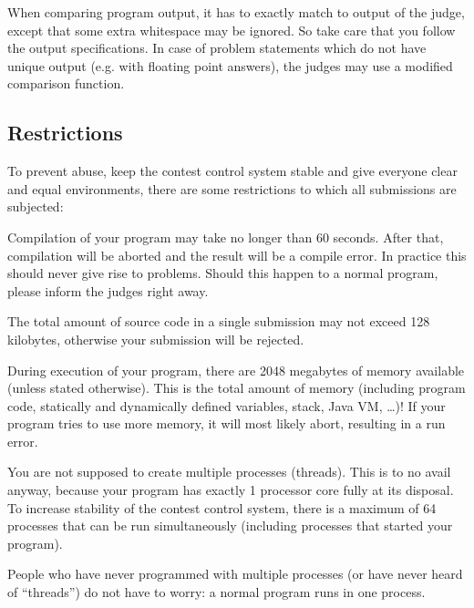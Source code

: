 When comparing program output, it has to exactly match to output of
the judge, except that some extra whitespace may be ignored. So take
care that you follow the output specifications. In case of problem
statements which do not have unique output (e.g. with floating point
answers), the judges may use a modified comparison function.

\subsection{Restrictions}\label{runlimits}

To prevent abuse, keep the contest control system stable and give everyone
clear and equal environments, there are some restrictions to which all
submissions are subjected:

\begin{description}
\item[compile time]
Compilation of your program may take no longer than 60
seconds. After that, compilation will be aborted and the result will
be a compile error. In practice this should never give rise to
problems. Should this happen to a normal program, please inform the
judges right away.

\item[source size]
The total amount of source code in a single submission may not exceed
128 kilobytes, otherwise your submission will be rejected.

\item[memory]
During execution of your program, there are 2048 megabytes of
memory available (unless stated otherwise). This is the total
amount of memory (including program code, statically and dynamically defined
variables, stack, Java VM, \dots)! If your program tries to use
more memory, it will most likely abort, resulting in a run
error.

\item[number of processes]
You are not supposed to create multiple processes (threads). This is
to no avail anyway, because your program has exactly 1 processor core fully
at its disposal. To increase stability of the contest control system, there is a
maximum of 64 processes that can be run simultaneously
(including processes that started your program).

People who have never programmed with multiple processes (or have
never heard of ``threads'') do not have to worry: a normal program
runs in one process.

\end{description}

